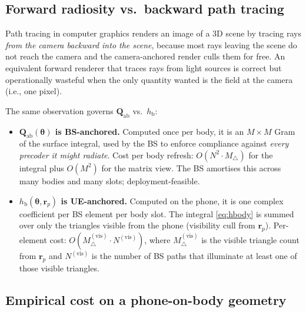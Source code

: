 \documentclass[11pt,a4paper]{article}
\theoremstyle{definition}
\newcommand{\rr}{\mathbf{r}}
\newcommand{\Qabs}{\mathbf{Q}_{\mathrm{ab}}}
\newcommand{\thetab}{\bm{\theta}}
\newcommand{\hbody}{h_{\mathrm{b}}}
\begin{document}
\subsection{Forward radiosity vs.\ backward path tracing}

Path tracing in computer graphics renders an image of a 3D scene
by tracing rays \emph{from the camera backward into the scene},
because most rays leaving the scene do not reach the camera and
the camera-anchored render culls them for free.  An equivalent
forward renderer that traces rays from light sources is
correct but operationally wasteful when the only quantity wanted
is the field at the camera (i.e., one pixel).

The same observation governs $\Qabs$ vs.\ $\hbody$:
\begin{itemize}[leftmargin=1.6em,itemsep=2pt]
\item \textbf{$\Qabs(\thetab)$ is BS-anchored.}  Computed once per
body, it is an $M\times M$ Gram of the surface integral, used by
the BS to enforce compliance against \emph{every precoder it might
radiate}.  Cost per body refresh:
$O(N^2\cdot M_\triangle)$ for the integral plus $O(M^2)$ for the
matrix view.  The BS amortises this across many bodies and many
slots; deployment-feasible.
\item \textbf{$\hbody(\thetab,\rr_p)$ is UE-anchored.}  Computed
on the phone, it is one complex coefficient per BS element per
body slot.  The integral
\cref{eq:hbody} is summed over only the triangles visible from the
phone (visibility cull from $\rr_p$).  Per-element cost:
$O(M_\triangle^{(\mathrm{vis})}\cdot N^{(\mathrm{vis})})$, where
$M_\triangle^{(\mathrm{vis})}$ is the visible triangle count from
$\rr_p$ and $N^{(\mathrm{vis})}$ is the number of BS paths that
illuminate at least one of those visible triangles.
\end{itemize}

\subsection{Empirical cost on a phone-on-body geometry}
\end{document}
